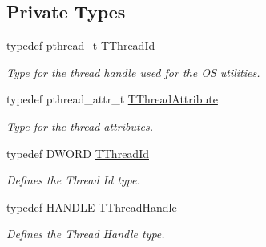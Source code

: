 \subsection*{Private Types}
\begin{DoxyCompactItemize}
\item 
typedef pthread\-\_\-t \hyperlink{class_thread_base_af8ec97aa7d89f9a4605a1c6c60777d5d}{T\-Thread\-Id}
\begin{DoxyCompactList}\small\item\em Type for the thread handle used for the O\-S utilities. \end{DoxyCompactList}\item 
typedef pthread\-\_\-attr\-\_\-t \hyperlink{class_thread_base_adea5ffdf2c74b95dbfee5148248f93b8}{T\-Thread\-Attribute}
\begin{DoxyCompactList}\small\item\em Type for the thread attributes. \end{DoxyCompactList}\item 
typedef D\-W\-O\-R\-D \hyperlink{class_thread_base_a76da3758dcb9858188c493eb9b811f3d}{T\-Thread\-Id}
\begin{DoxyCompactList}\small\item\em Defines the Thread Id type. \end{DoxyCompactList}\item 
typedef H\-A\-N\-D\-L\-E \hyperlink{class_thread_base_ad87b599650c2062b6ff7e54934da7e2b}{T\-Thread\-Handle}
\begin{DoxyCompactList}\small\item\em Defines the Thread Handle type. \end{DoxyCompactList}\end{DoxyCompactItemize}
